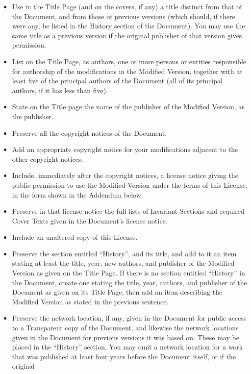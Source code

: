 \documentclass[twoside,openright,a4paper]{book}
\begin{document}
	\begin{itemize}

	\item Use in the Title Page (and on the covers, if any) a title distinct
	from that of the Document, and from those of previous versions
	(which should, if there were any, be listed in the History section
	of the Document).  You may use the same title as a previous version
	if the original publisher of that version gives permission.
	\item List on the Title Page, as authors, one or more persons or entities
	responsible for authorship of the modifications in the Modified
	Version, together with at least five of the principal authors of the
	Document (all of its principal authors, if it has less than five).
	\item State on the Title page the name of the publisher of the
	Modified Version, as the publisher.
	\item Preserve all the copyright notices of the Document.
	\item Add an appropriate copyright notice for your modifications
	adjacent to the other copyright notices.
	\item Include, immediately after the copyright notices, a license notice
	giving the public permission to use the Modified Version under the
	terms of this License, in the form shown in the Addendum below.
	\item Preserve in that license notice the full lists of Invariant Sections
	and required Cover Texts given in the Document's license notice.
	\item Include an unaltered copy of this License.
	\item Preserve the section entitled ``History'', and its title, and add to
	it an item stating at least the title, year, new authors, and
	publisher of the Modified Version as given on the Title Page.  If
	there is no section entitled ``History'' in the Document, create one
	stating the title, year, authors, and publisher of the Document as
	given on its Title Page, then add an item describing the Modified
	Version as stated in the previous sentence.
	\item Preserve the network location, if any, given in the Document for
	public access to a Transparent copy of the Document, and likewise
	the network locations given in the Document for previous versions
	it was based on.  These may be placed in the ``History'' section.
	You may omit a network location for a work that was published at
	least four years before the Document itself, or if the original

\end{itemize}
\end{document}
